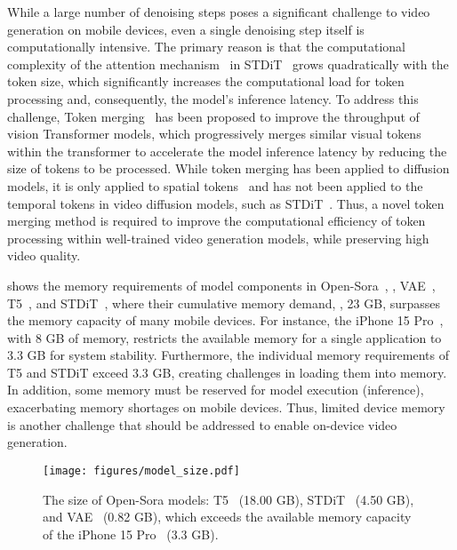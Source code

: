 While a large number of denoising steps poses a significant challenge to video generation on mobile devices, even a single denoising step itself is computationally intensive. The primary reason is that the computational complexity of the attention mechanism~\cite{niu2021review} in STDiT~\cite{opensora} grows quadratically with the token size, which significantly increases the computational load for token processing and, consequently, the model's inference latency. To address this challenge, Token merging~\cite{bolya2023token} has been proposed to improve the throughput of vision Transformer models, which progressively merges similar visual tokens within the transformer to accelerate the model inference latency by reducing the size of tokens to be processed. %
While token merging has been applied to diffusion models, it is only applied to spatial tokens~\cite{bolya2022token,bolya2023token} and has not been applied to the temporal tokens in video diffusion models, such as STDiT~\cite{opensora}. Thus, a novel token merging method is required to improve the computational efficiency of token processing within well-trained video generation models, while preserving high video quality.

 shows the memory requirements of model components in Open-Sora~\cite{opensora}, \ie, VAE~\cite{doersch2016tutorial}, T5~\cite{raffel2020exploring}, and STDiT~\cite{opensora}, where their cumulative memory demand, \ie, 23 GB, surpasses the memory capacity of many mobile devices. For instance, the iPhone 15 Pro~\cite{apple2023}, with 8 GB of memory, restricts the available memory for a single application to 3.3 GB for system stability. Furthermore, the individual memory requirements of T5 and STDiT exceed 3.3 GB, creating challenges in loading them into memory. In addition, some memory must be reserved for model execution (inference), exacerbating memory shortages on mobile devices. Thus, limited device memory is another challenge that should be addressed to enable on-device video generation.

\begin{figure}[!htb]
    \centering
    \texttt{[image: figures/model\_size.pdf]}
    \caption{The size of Open-Sora models: T5~\cite{raffel2020exploring} (18.00 GB), STDiT~\cite{opensora} (4.50 GB), and {VAE~\cite{doersch2016tutorial} (0.82 GB)}, which exceeds the available memory capacity of the iPhone 15 Pro~\cite{apple2023} (3.3 GB).}
    \label{fig:peak-memory}
\end{figure}